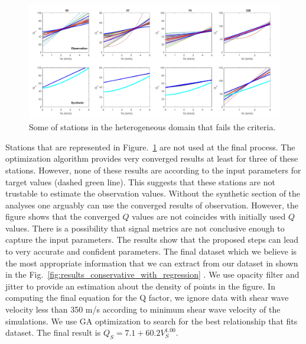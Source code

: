   \begin{figure}[ht]
    \centering
    \includegraphics[width=\textwidth]{figures/pdf/Figure_21.pdf}
    \caption{Some of stations in the heterogeneous domain that fails the criteria. }
    \label{fig:unused_stations_example}
\end{figure}

Stations that are represented in Figure.~\ref{fig:unused_stations_example} are not used at the final process. The optimization algorithm provides very converged results at least for three of these stations. However, none of these results are according to the input parameters for target values (dashed green line). This suggests that these stations are not trustable to estimate the observation values. Without the synthetic section of the analyses one arguably can use the converged results of observation. However, the figure shows that the converged $Q$ values are not coincides with initially used $Q$ values. There is a possibility that signal metrics are not conclusive enough to capture the input parameters. The results show that the proposed steps can lead to very accurate and confident parameters. 
The final dataset which we believe is the most appropriate information that we can extract from our dataset in shown in the Fig.~\ref{fig:results_conservative_with_regression} . We use opacity filter and jitter to provide an estimation about the density of points in the figure. In computing the final equation for the Q factor, we ignore data with shear wave velocity less than 350 m/s according to minimum shear wave velocity of the simulations. We use GA optimization to search for the best \qsvs{} relationship that fits dataset.  The final result is $Q_{S}=7.1+60.2 V_{S}^{1.00}$. 


